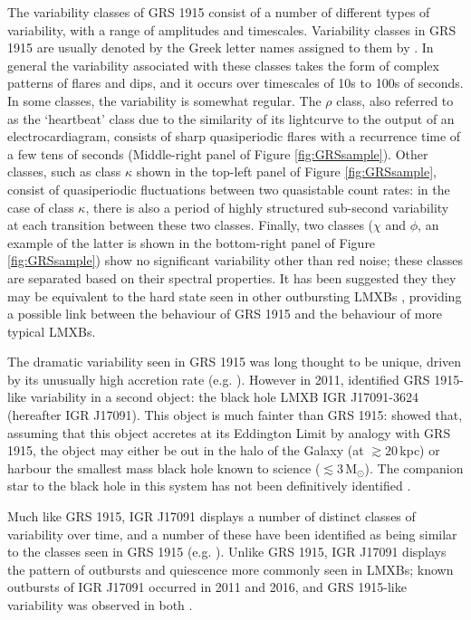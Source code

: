 \par The variability classes of GRS 1915 consist of a number of different types of variability, with a range of amplitudes and timescales.  Variability classes in GRS 1915 are usually denoted by the Greek letter names assigned to them by \citet{Belloni_GRS_MI}.  In general the variability associated with these classes takes the form of complex patterns of flares and dips, and it occurs over timescales of 10s to 100s of seconds.  In some classes, the variability is somewhat regular.  The $\rho$ class, also referred to as the `heartbeat' class due to the similarity of its lightcurve to the output of an electrocardiagram, consists of sharp quasiperiodic flares with a recurrence time of a few tens of seconds (Middle-right panel of Figure \ref{fig:GRSsample}).  Other classes, such as class $\kappa$ shown in the top-left panel of Figure \ref{fig:GRSsample}, consist of quasiperiodic fluctuations between two quasistable count rates: in the case of class $\kappa$, there is also a period of highly structured sub-second variability at each transition between these two classes.  Finally, two classes ($\chi$ and $\phi$, an example of the latter is shown in the bottom-right panel of Figure \ref{fig:GRSsample}) show no significant variability other than red noise; these classes are separated based on their spectral properties.  It has been suggested they they may be equivalent to the hard state seen in other outbursting LMXBs \citep{VanOers_GRSHard}, providing a possible link between the behaviour of GRS 1915 and the behaviour of more typical LMXBs.
\par The dramatic variability seen in GRS 1915 was long thought to be unique, driven by its unusually high accretion rate (e.g. \citealp{Belloni_Timescales}).  However in 2011, \citet{Altamirano_IGR_FH} identified GRS 1915-like variability in a second object: the black hole LMXB IGR J17091-3624 (hereafter IGR J17091).  This object is much fainter than GRS 1915: \citet{Altamirano_IGR_FH} showed that, assuming that this object accretes at its Eddington Limit by analogy with GRS 1915, the object may either be out in the halo of the Galaxy (at $\gtrsim20$\,kpc) or harbour the smallest mass black hole known to science ($\lesssim3$\,M$_\odot$).  The companion star to the black hole in this system has not been definitively identified \citep{Chaty_IGRCompanion}.
\par Much like GRS 1915, IGR J17091 displays a number of distinct classes of variability over time, and a number of these have been identified as being similar to the classes seen in GRS 1915 (e.g. \citealp{Altamirano_IGR_FH,Zhang_IGR}).  Unlike GRS 1915, IGR J17091 displays the pattern of outbursts and quiescence more commonly seen in LMXBs; known outbursts of IGR J17091 occurred in 2011 and 2016, and GRS 1915-like variability was observed in both \citep{Reynolds_2016HB}.
